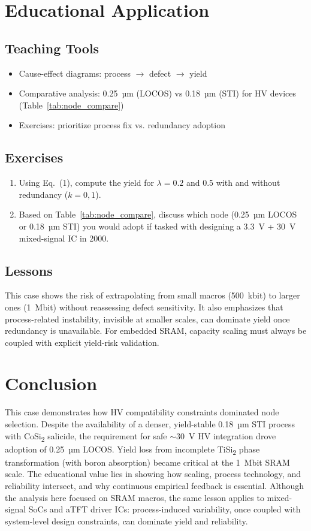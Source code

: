 \documentclass[conference]{IEEEtran}
\begin{document}
\section{Educational Application}
\subsection{Teaching Tools}
\begin{itemize}
    \item Cause-effect diagrams: process $\rightarrow$ defect $\rightarrow$ yield
    \item Comparative analysis: 0.25~µm (LOCOS) vs 0.18~µm (STI) for HV devices (Table~\ref{tab:node_compare})
    \item Exercises: prioritize process fix vs. redundancy adoption
\end{itemize}

\subsection{Exercises}
\begin{enumerate}
  \item Using Eq.~(1), compute the yield for $\lambda=0.2$ and 0.5 with and without redundancy ($k=0,1$).
  \item Based on Table~\ref{tab:node_compare}, discuss which node (0.25~µm LOCOS or 0.18~µm STI) you would adopt if tasked with designing a 3.3~V + 30~V mixed-signal IC in 2000.
\end{enumerate}

\subsection{Lessons}
This case shows the risk of extrapolating from small macros (500~kbit) to larger ones (1~Mbit) without reassessing defect sensitivity.
It also emphasizes that process-related instability, invisible at smaller scales, can dominate yield once redundancy is unavailable.
For embedded SRAM, capacity scaling must always be coupled with explicit yield-risk validation.

\section{Conclusion}
This case demonstrates how HV compatibility constraints dominated node selection.
Despite the availability of a denser, yield-stable 0.18~µm STI process with CoSi\textsubscript{2} salicide, the requirement for safe $\sim$30~V HV integration drove adoption of 0.25~µm LOCOS.
Yield loss from incomplete TiSi\textsubscript{2} phase transformation (with boron absorption) became critical at the 1~Mbit SRAM scale.
The educational value lies in showing how scaling, process technology, and reliability intersect, and why continuous empirical feedback is essential.
Although the analysis here focused on SRAM macros, the same lesson applies to mixed-signal SoCs and aTFT driver ICs: process-induced variability, once coupled with system-level design constraints, can dominate yield and reliability.
\end{document}
